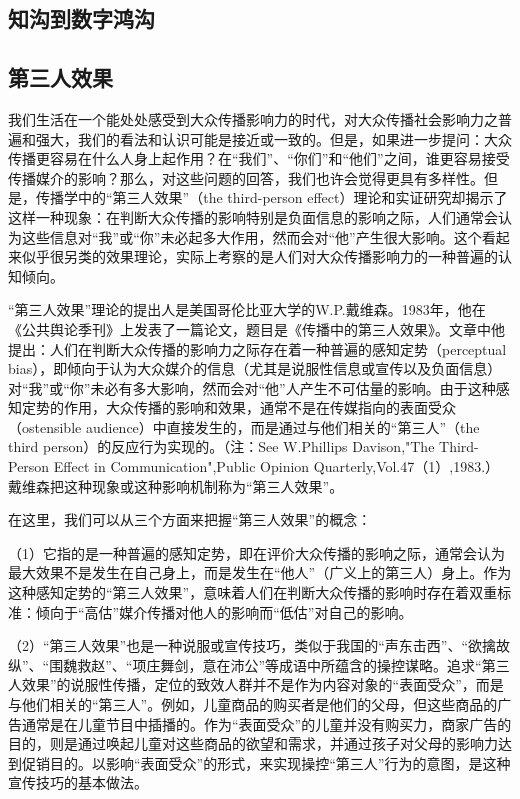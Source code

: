 \documentclass[UTF8,12pt]{ctexart}
\numberwithin{equation}{section} %
\numberwithin{figure}{section}
\numberwithin{table}{section}
\begin{document}
	\subsection{知沟到数字鸿沟}
	
	\subsection{第三人效果}
	我们生活在一个能处处感受到大众传播影响力的时代，对大众传播社会影响力之普遍和强大，我们的看法和认识可能是接近或一致的。但是，如果进一步提问：大众传播更容易在什么人身上起作用？在“我们”、“你们”和“他们”之间，谁更容易接受传播媒介的影响？那么，对这些问题的回答，我们也许会觉得更具有多样性。但是，传播学中的“第三人效果”（the third-person effect）理论和实证研究却揭示了这样一种现象：在判断大众传播的影响特别是负面信息的影响之际，人们通常会认为这些信息对“我”或“你”未必起多大作用，然而会对“他”产生很大影响。这个看起来似乎很另类的效果理论，实际上考察的是人们对大众传播影响力的一种普遍的认知倾向。
	
	“第三人效果”理论的提出人是美国哥伦比亚大学的W.P.戴维森。1983年，他在《公共舆论季刊》上发表了一篇论文，题目是《传播中的第三人效果》。文章中他提出：人们在判断大众传播的影响力之际存在着一种普遍的感知定势（perceptual bias），即倾向于认为大众媒介的信息（尤其是说服性信息或宣传以及负面信息）对“我”或“你”未必有多大影响，然而会对“他”人产生不可估量的影响。由于这种感知定势的作用，大众传播的影响和效果，通常不是在传媒指向的表面受众（ostensible audience）中直接发生的，而是通过与他们相关的“第三人”（the third person）的反应行为实现的。（注：See W.Phillips Davison,"The Third-Person Effect in Communication",Public Opinion Quarterly,Vol.47（1）,1983.）戴维森把这种现象或这种影响机制称为“第三人效果”。
	
	在这里，我们可以从三个方面来把握“第三人效果”的概念：
	
	（1）它指的是一种普遍的感知定势，即在评价大众传播的影响之际，通常会认为最大效果不是发生在自己身上，而是发生在“他人”（广义上的第三人）身上。作为这种感知定势的“第三人效果”，意味着人们在判断大众传播的影响时存在着双重标准：倾向于“高估”媒介传播对他人的影响而“低估”对自己的影响。
	
	（2）“第三人效果”也是一种说服或宣传技巧，类似于我国的“声东击西”、“欲擒故纵”、“围魏救赵”、“项庄舞剑，意在沛公”等成语中所蕴含的操控谋略。追求“第三人效果”的说服性传播，定位的致效人群并不是作为内容对象的“表面受众”，而是与他们相关的“第三人”。例如，儿童商品的购买者是他们的父母，但这些商品的广告通常是在儿童节目中插播的。作为“表面受众”的儿童并没有购买力，商家广告的目的，则是通过唤起儿童对这些商品的欲望和需求，并通过孩子对父母的影响力达到促销目的。以影响“表面受众”的形式，来实现操控“第三人”行为的意图，是这种宣传技巧的基本做法。
	
\end{document}
